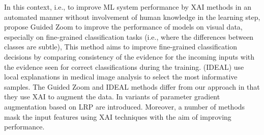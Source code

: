 In this context, i.e., to improve ML system performance by XAI methods in an automated manner without involvement of human knowledge in the learning step, \cite{bargal2021guided} propose Guided Zoom to improve the performance of models on visual data, especially on fine-grained classification tasks (i.e., where the differences between classes are subtle),  This method aims to improve fine-grained classification decisions by comparing consistency of the evidence for the incoming inputs with the evidence seen for correct classifications during the training. %
\cite{mahapatra2021interpretability} (IDEAL) use local explanations in medical image analysis to select the most informative samples. %
The Guided Zoom \citep{bargal2021guided} and IDEAL \citep{mahapatra2021interpretability} methods differ from our approach in that they use XAI to augment the data. 
In \cite{ha2019improvement} variants of parameter gradient augmentation based on LRP \citep{montavon2019layer} are introduced.%
Moreover, a number of methods \citep{schiller2019relevance, zunino2021excitation,ismail2021improving, apicella2023strategies} mask the input features using XAI techniques with the aim of improving performance. %


